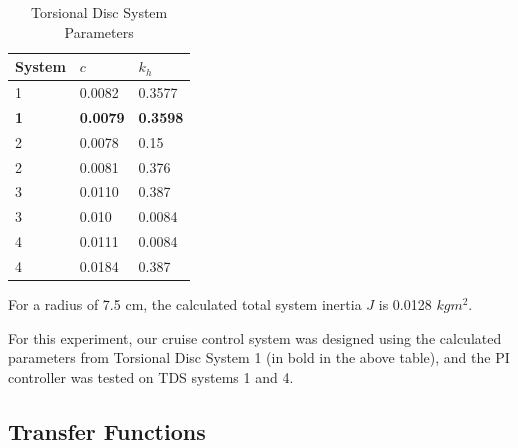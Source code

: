 \documentclass[11pt,titlepage]{article}
\begin{document}
    
            \begin{table}[h!]
            \centering
            \begin{tabular}{|m{4cm}|m{3cm}|m{3cm}|} 
                \hline
                System & $c$ &$k_h$ \\ 
                \hline
                1 &  0.0082 & 0.3577\\
                \hline
                \textbf{1} & \textbf{0.0079} & \textbf{0.3598}\\
                \hline
                2 & 0.0078 & 0.15\\
                \hline
                2 & 0.0081 & 0.376\\
                \hline
                3 & 0.0110 & 0.387\\
                \hline
                3 & 0.010 & 0.0084\\
                \hline
                4 & 0.0111 & 0.0084\\
                \hline
                4 & 0.0184 & 0.387\\
                \hline
            \end{tabular}
            \caption{Torsional Disc System Parameters} \label{table:TDS_param}
        \end{table}
        
        For a radius of 7.5 cm, the calculated total system inertia $J$ is 0.0128 $kg m^2$.
        
        For this experiment, our cruise control system was designed using the calculated parameters from Torsional Disc System 1 (in bold in the above table), and the PI controller was tested on TDS systems 1 and 4.

    \subsection{Transfer Functions}
    
\end{document}
